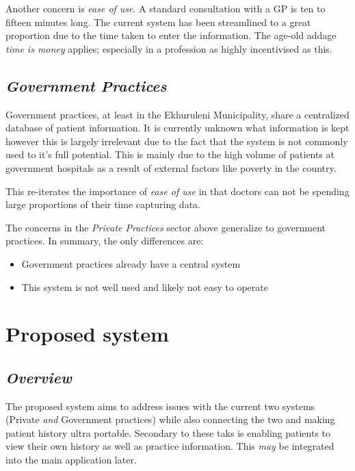 \documentclass[a4paper]{article}
\begin{document}
Another concern is \emph{ease of use}. A standard consultation with a GP is ten to fifteen minutes long. The current system has been streamlined to a great proportion due to the time taken to enter the information. The age-old addage \emph{time is money} applies; especially in a profession as highly incentivised as this.

\subsection{\textit{Government Practices}}
Government practices, at least in the Ekhuruleni Municipality, share a centralized database of patient information. It is currently unknown what information is kept however this is largely irrelevant due to the fact that the system is not commonly used to it's full potential. This is mainly due to the high volume of patients at government hospitals as a result of external factors like poverty in the country.

This re-iterates the importance of \emph{ease of use} in that doctors can not be spending large proportions of their time capturing data.

The concerns in the \emph{Private Practices} sector above generalize to government practices. In summary, the only differences are:
\begin{itemize}
	\item Government practices already have a central system
	\item This system is not well used and likely not easy to operate
\end{itemize}
	
\newpage

\section{Proposed system}
\subsection{\textit{Overview}}
The proposed system aims to address issues with the current two systems (Private \emph{and} Government practices) while also connecting the two and making patient history ultra portable. Secondary to these taks is enabling patients to view their own history as well as practice information. This \emph{may} be integrated into the main application later.
		
\end{document}
